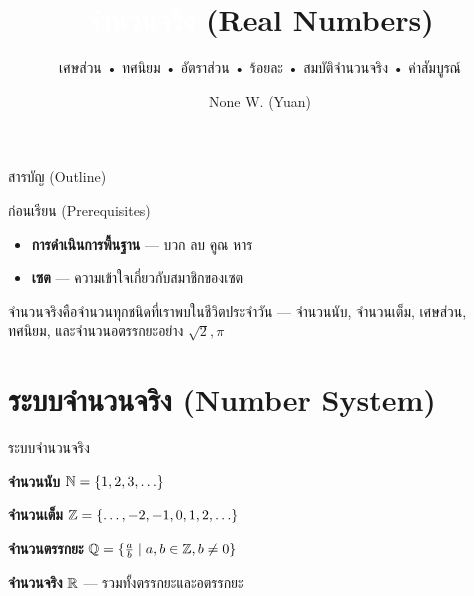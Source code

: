 \documentclass[11pt, aspectratio=169]{beamer}
\title[จำนวนจริง]{\textcolor{white}{จำนวนจริง} \textcolor{boxBlue!60}{(Real Numbers)}}
\subtitle{เศษส่วน • ทศนิยม • อัตราส่วน • ร้อยละ • สมบัติจำนวนจริง • ค่าสัมบูรณ์ }
\author[None W. (Yuan)]{None W. (Yuan)}
\date{}
\begin{document}
\begin{frame}[plain]
  \titlepage
\end{frame}

\begin{frame}{สารบัญ (Outline)}
  \tableofcontents
\end{frame}

\begin{frame}{ก่อนเรียน (Prerequisites)}
  \begin{explanation}
    \begin{itemize}
      \item \textbf{การดำเนินการพื้นฐาน} — บวก ลบ คูณ หาร
      \item \textbf{เซต} — ความเข้าใจเกี่ยวกับสมาชิกของเซต
    \end{itemize}
  \end{explanation}

  \begin{intuition}
    จำนวนจริงคือจำนวนทุกชนิดที่เราพบในชีวิตประจำวัน — จำนวนนับ, จำนวนเต็ม,
    เศษส่วน, ทศนิยม, และจำนวนอตรรกยะอย่าง $\sqrt{2}, \pi$
  \end{intuition}
\end{frame}

\section{ระบบจำนวนจริง (Number System)}

\begin{frame}{ระบบจำนวนจริง}
  \begin{explanation}[แผนภาพระบบจำนวน]
    \textbf{จำนวนนับ} $\mathbb{N} = \{1, 2, 3, \ldots\}$

    \textbf{จำนวนเต็ม} $\mathbb{Z} = \{\ldots, -2, -1, 0, 1, 2, \ldots\}$

    \textbf{จำนวนตรรกยะ} $\mathbb{Q} = \{\frac{a}{b} \mid a, b \in \mathbb{Z}, b \neq 0\}$

    \textbf{จำนวนจริง} $\mathbb{R}$ — รวมทั้งตรรกยะและอตรรกยะ

    \medskip
    \highlight{$\N \subset \Z \subset \Q \subset \R$}
  \end{explanation}
\end{frame}
\end{document}
